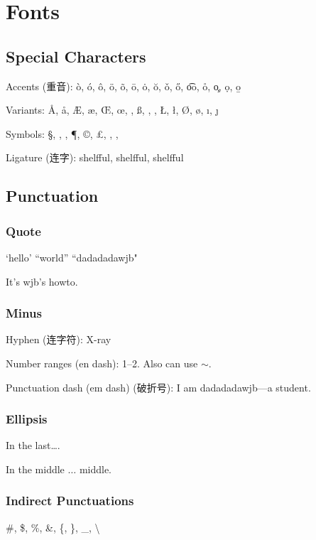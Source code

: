 \section{Fonts}
\subsection{Special Characters}
Accents (重音): 
{\LARGE
    \`o, \'o, \^o, \"o, \~o, \=o, \.o, \u{o}, \v{o}, \H{o}, \t{oo}, \r{o}, \c{o}, \d{o}, \b{o}
}

Variants: 
{\LARGE
    \AA, \aa, \AE, \ae, \OE, \oe, \SS, \ss, \IJ, \ij, \L, \l, \O, \o, \i, \j
}

Symbols: 
{\LARGE
    \S, \dag, \ddag, \P, \copyright, \pounds,                       %
    \textregistered, \texttrademark, \textbullet
}

Ligature (连字): shelfful, shelf{}ful, shelf\/ful

\subsection{Punctuation}
\subsubsection{Quote}
`hello' ``world'' ``dadadadawjb"

It's wjb's howto.

\subsubsection{Minus}
Hyphen (连字符): X-ray

Number ranges (en dash): 1--2. Also can use $\sim$.

Punctuation dash (em dash) (破折号): I am dadadadawjb---a student.

\subsubsection{Ellipsis}
In the last\ldots.

In the middle $\ldots$ middle.

\subsubsection{Indirect Punctuations}
\#, \$, \%, \&, \{, \}, \_, \textbackslash

